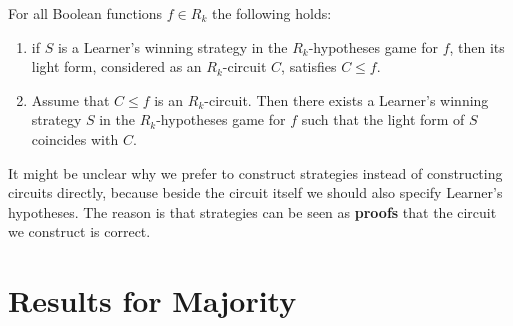 \begin{proposition}
\label{R_k_equivalence}
For all Boolean functions $f\in R_k$ the following holds:
\begin{enumerate}[label=(\alph*)]
\item if $S$ is a Learner's winning strategy in the $R_k$-hypotheses game for $f$, then its light form, considered as an $R_k$-circuit $C$, satisfies $C\le f$.


\item  Assume that $C\le f$ is an $R_k$-circuit. Then there exists a Learner's winning strategy $S$ in the $R_k$-hypotheses game for $f$ such that the light form of $S$ coincides with $C$.
\end{enumerate}
\end{proposition}
\begin{remark}
It might be unclear why we prefer to construct strategies instead of constructing circuits directly, because beside the circuit itself we should also specify Learner's hypotheses. The reason is that strategies can be seen as \textbf{proofs} that the circuit we construct is correct.
\end{remark}





















\section{Results for Majority} \label{sec:majority}

